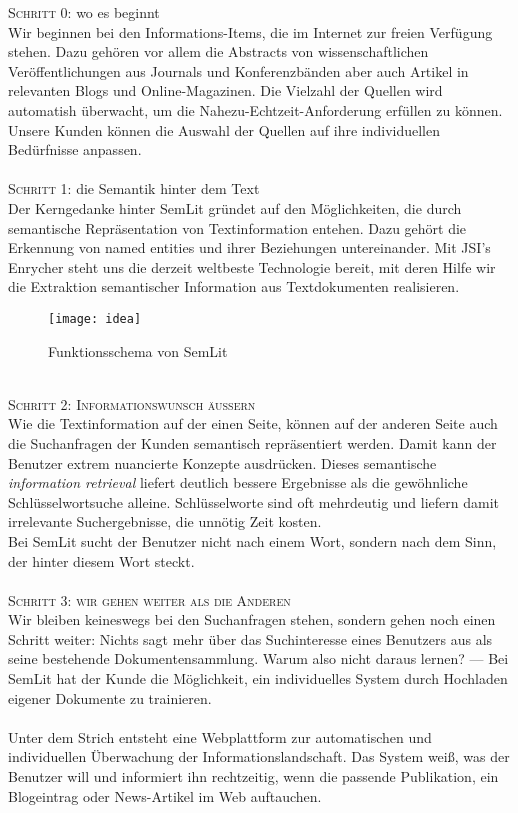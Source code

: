 \textsc{Schritt 0:} wo es beginnt\\
Wir beginnen bei den Informations-Items, die im Internet zur freien Verfügung stehen. Dazu gehören vor allem die Abstracts von wissenschaftlichen Veröffentlichungen aus Journals und Konferenzbänden aber auch Artikel in relevanten Blogs und Online-Magazinen. Die Vielzahl der Quellen wird automatish überwacht, um die Nahezu-Echtzeit-Anforderung erfüllen zu können.\\
{\color{orange}Unsere Kunden können die Auswahl der Quellen auf ihre individuellen Bedürfnisse anpassen. }
\\
\\
\textsc{Schritt 1:} die Semantik hinter dem Text\\
Der Kerngedanke hinter SemLit gründet auf den Möglichkeiten, die durch semantische Repräsentation von Textinformation entehen. Dazu gehört die Erkennung von named entities und ihrer Beziehungen untereinander. Mit JSI's Enrycher steht uns die derzeit weltbeste Technologie bereit, mit deren Hilfe wir die Extraktion semantischer Information aus Textdokumenten realisieren. 
\\
\begin{figure}[h!]
\centering
\texttt{[image: idea]}
\caption{Funktionsschema von SemLit}
\label{fig:idea}
\end{figure}
\\
\textsc{Schritt 2: Informationswunsch äußern}\\
Wie die Textinformation auf der einen Seite, können auf der anderen Seite auch die Suchanfragen der Kunden semantisch repräsentiert werden. Damit kann der Benutzer extrem nuancierte Konzepte ausdrücken. 
Dieses semantische \emph{information retrieval} liefert deutlich bessere Ergebnisse als die gewöhnliche Schlüsselwortsuche alleine. Schlüsselworte sind oft mehrdeutig und liefern damit irrelevante Suchergebnisse, die unnötig Zeit kosten. \\
{\color{orange}Bei SemLit sucht der Benutzer nicht nach einem Wort, sondern nach dem Sinn, der hinter diesem Wort steckt.}
\\
\\
\textsc{Schritt 3: wir gehen weiter als die Anderen}\\
Wir bleiben keineswegs bei den Suchanfragen stehen, sondern gehen noch einen Schritt weiter: Nichts sagt mehr über das Suchinteresse eines Benutzers aus als seine bestehende Dokumentensammlung. Warum also nicht daraus lernen? --- Bei SemLit hat der Kunde die Möglichkeit, ein individuelles System durch Hochladen eigener Dokumente zu trainieren.
\\
\\
{\color{orange}Unter dem Strich entsteht eine Webplattform zur automatischen und individuellen Überwachung der Informationslandschaft. Das System weiß, was der Benutzer will und informiert ihn rechtzeitig, wenn die passende Publikation, ein Blogeintrag oder News-Artikel im Web auftauchen.}

